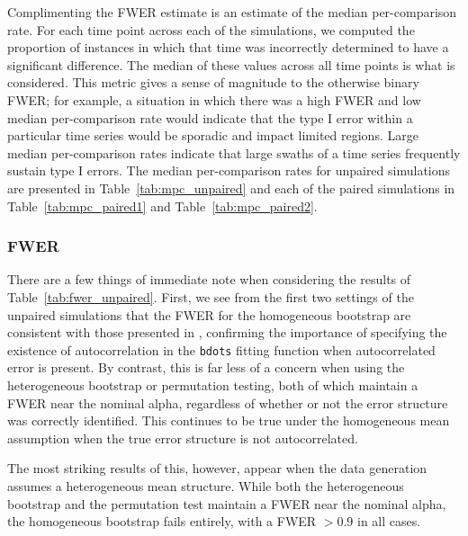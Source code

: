 \documentclass{article}
\newcommand{\xt}{\texttt}
\begin{document}
Complimenting the FWER estimate is an estimate of the median per-comparison rate. For each time point across each of the simulations, we computed the proportion of instances in which that time was incorrectly determined to have a significant difference. The median of these values across all time points is what is considered. This metric gives a sense of magnitude to the otherwise binary FWER; for example, a situation in which there was a high FWER and low median per-comparison rate would indicate that the type I error within a particular time series would be sporadic and impact limited regions. Large median per-comparison rates indicate that large swaths of a time series frequently sustain type I errors. The median per-comparison rates for unpaired simulations are presented in Table~\ref{tab:mpc_unpaired} and each of the paired simulations in Table~\ref{tab:mpc_paired1} and Table~\ref{tab:mpc_paired2}.


\subsubsection{FWER}



There are a few things of immediate note when considering the results of Table~\ref{tab:fwer_unpaired}. First, we see from the first two settings of the unpaired simulations that the FWER for the homogeneous bootstrap are consistent with those presented in \citet{oleson2017detecting}, confirming the importance of specifying the existence of autocorrelation in the \xt{bdots} fitting function when autocorrelated error is present. By contrast, this is far less of a concern when using the heterogeneous bootstrap or permutation testing, both of which maintain a FWER near the nominal alpha, regardless of whether or not the error structure was correctly identified. This continues to be true under the homogeneous mean assumption when the true error structure is not autocorrelated. 

The most striking results of this, however, appear when the data generation assumes a heterogeneous mean structure. While both the heterogeneous bootstrap and the permutation test maintain a FWER near the nominal alpha, the homogeneous bootstrap fails entirely, with a FWER $> 0.9$ in all cases.
\end{document}
